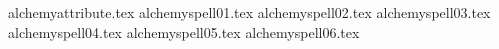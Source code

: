 

\tablelabels
{alchemyattribute.tex}%
\spellrule
{alchemyspell01.tex}%
\spellrule
{alchemyspell02.tex}%
\spellrule
{alchemyspell03.tex}%
\spellrule
{alchemyspell04.tex}%
\spellrule
{alchemyspell05.tex}%
\spellrule
{alchemyspell06.tex}%
\closetable{}
